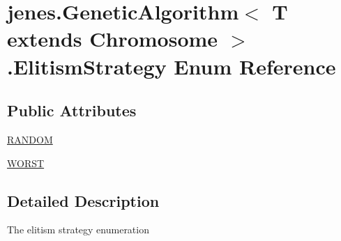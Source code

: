 \hypertarget{enumjenes_1_1_genetic_algorithm_3_01_t_01extends_01_chromosome_01_4_1_1_elitism_strategy}{\section{jenes.\-Genetic\-Algorithm$<$ T extends Chromosome $>$.Elitism\-Strategy Enum Reference}
\label{enumjenes_1_1_genetic_algorithm_3_01_t_01extends_01_chromosome_01_4_1_1_elitism_strategy}
}
\subsection*{Public Attributes}
\begin{DoxyCompactItemize}
\item 
\hyperlink{enumjenes_1_1_genetic_algorithm_3_01_t_01extends_01_chromosome_01_4_1_1_elitism_strategy_a591ab5eac2a1d3f09f99ab362ee54f65}{R\-A\-N\-D\-O\-M}
\item 
\hyperlink{enumjenes_1_1_genetic_algorithm_3_01_t_01extends_01_chromosome_01_4_1_1_elitism_strategy_a60c1acf7a272aca7e29b422a124a2ee2}{W\-O\-R\-S\-T}
\end{DoxyCompactItemize}


\subsection{Detailed Description}
The elitism strategy enumeration 

